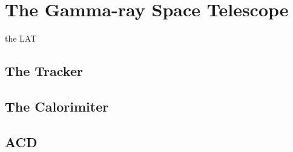 \section{The \fermi Gamma-ray Space Telescope}

the \ac{LAT}

\subsection{The Tracker}
\subsection{The Calorimiter}
\subsection{\acf{ACD}}

\subsection{}

